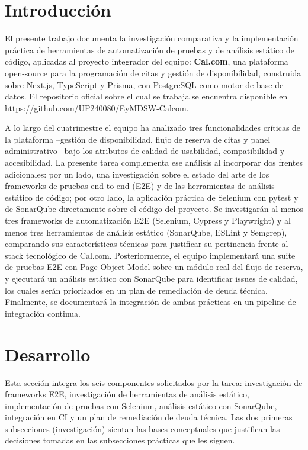 \documentclass{article}
\begin{document}
\newpage
\section{Introducción}
El presente trabajo documenta la investigación comparativa y la
implementación práctica de herramientas de automatización de pruebas
y de análisis estático de código, aplicadas al proyecto integrador
del equipo: \textbf{Cal.com}, una plataforma open-source para la
programación de citas y gestión de disponibilidad, construida sobre
Next.js, TypeScript y Prisma, con PostgreSQL como motor de base de
datos. El repositorio oficial sobre el cual se trabaja se encuentra
disponible en \url{https://github.com/UP240080/EyMDSW-Calcom}.

A lo largo del cuatrimestre el equipo ha analizado tres
funcionalidades críticas de la plataforma --gestión de
disponibilidad, flujo de reserva de citas y panel administrativo--
bajo los atributos de calidad de usabilidad, compatibilidad y
accesibilidad. La presente tarea complementa ese análisis al
incorporar dos frentes adicionales: por un lado, una investigación
sobre el estado del arte de los frameworks de pruebas end-to-end
(E2E) y de las herramientas de análisis estático de código; por otro
lado, la aplicación práctica de Selenium con pytest y de SonarQube
directamente sobre el código del proyecto.
Se investigarán al menos tres frameworks de automatización E2E
(Selenium, Cypress y Playwright) y al menos tres herramientas de
análisis estático (SonarQube, ESLint y Semgrep), comparando sus
características técnicas para justificar su pertinencia frente al
stack tecnológico de Cal.com. Posteriormente, el equipo implementará
una suite de pruebas E2E con Page Object Model sobre un módulo real
del flujo de reserva, y ejecutará un análisis estático con
SonarQube para identificar issues de calidad, los cuales serán
priorizados en un plan de remediación de deuda técnica. Finalmente,
se documentará la integración de ambas prácticas en un pipeline de
integración continua.



\section{Desarrollo}

Esta sección integra los seis componentes solicitados por la tarea:
investigación de frameworks E2E, investigación de herramientas de
análisis estático, implementación de pruebas con Selenium,
análisis estático con SonarQube, integración en CI y un plan de
remediación de deuda técnica. Las dos primeras subsecciones
(investigación) sientan las bases conceptuales que justifican las
decisiones tomadas en las subsecciones prácticas que les siguen.
\end{document}
